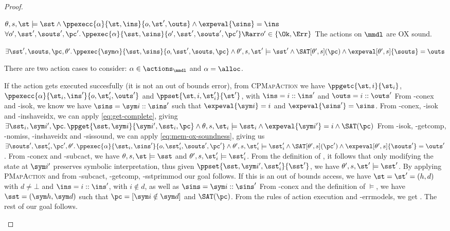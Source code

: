 \begin{proof}


\pfassume \begin{hypvlist}
 $\theta,s,\st\models\sst \land \ppexecc{\alpha}{\st,\ins}{o,\st',\outs} \land \expeval{\sins}=\ins$
 $\forall o', \sst', \souts', \pc'\ldotp \ppexec{\alpha}{\sst,\sins}{o',\sst',\souts',\pc'} \Rarr o' \in \{ \Ok, \Err \}$
 The actions on $\mmdl$ are OX sound.
\end{hypvlist}
\pfprove \begin{goalvlist}
 $\exists \sst',\souts,\pc,\theta'\ldotp \ppexec{\sym\alpha}{\sst,\sins}{o,\sst',\souts,\pc} \land \theta',s,\st'\models \sst' \land  \SAT[\theta',s](\pc) \land \expeval[\theta',s]{\souts}=\outs$
\end{goalvlist}

There are two action cases to consider: $\alpha\in\actions_\mmdl$ and $\alpha=\alloc$.

\pfcase{$\alpha\in\actions_\mmdl$}

\begin{hypvlist}
 If the action gets executed succesfully (it is not an out of bounds error), from \textsc{CPMapAction} we have $\ppgetc{\st,i}{\st_i}$,  $\ppexecc{\alpha}{\st_i,\ins'}{o,\st'_i,\outs'}$ and $\ppset{\st,i,\st'_i}{\st'}$, with $\ins=i::\ins'$ and $\outs=i::\outs'$
 From \hyp{conex} and \hyp{isok}, we know we have $\sins=\sym i::\sins'$ such that $\expeval{\sym i}=i$ and $\expeval{\sins'}=\sins$.%
 From \hyp{conex}, \hyp{isok} and \hyp{inshaveidx}, we can apply \ref{eq:get-complete}, giving $\exists \sst_i, \sym i', \pc \ldotp \ppget{\sst,\sym i}{\sym i', \sst_i, \pc} \land \theta,s,\st_i\models\sst_i \land \expeval{\sym i'}=i \land \SAT(\pc)$
 From \hyp{isok}, \hyp{getcomp}, \hyp{nomiss}, \hyp{inshaveidx} and \hyp{sissound}, we can apply \ref{eq:mem-ox-soundness}, giving us $\exists \souts',\sst'_i,\pc',\theta'\ldotp \ppexec{\alpha}{\sst_i,\sins'}{o,\sst'_i,\souts',\pc'}\land \theta',s,\st_i'\models\sst_i' \land \SAT[\theta',s](\pc') \land \expeval[\theta',s]{\souts'}=\outs'$.%
 From \hyp{conex} and \hyp{subcact}, we have $\theta,s,\st\models\sst$ and $\theta',s,\st_i'\models\sst_i'$. From the definition of , it follows that only modifying the state at $\sym i'$ preserves symbolic interpretation, thus given $\ppset{\sst,\sym i',\sst_i'}{\sst'}$, we have $\theta',s,\st'\models\sst'$.
 By applying \textsc{PMapAction} and from \hyp{subcact}, \hyp{getcomp}, \hyp{sstprimmod} our goal  follows.
 If this is an out of bounds access, we have $\st=\st'=(h,d)$ with $d\neq\bot$ and $\ins=i::\ins'$, with $i\notin d$, as well as $\sins=\sym i::\sins'$ 
 From \hyp{conex} and the definition of $\models$, we have $\sst=(\sym h, \sym d)$ such that $\pc=[\sym i\notin \sym d]$ and $\SAT(\pc)$. 
 From the rules of action execution and \hyp{errmodels}, we get \ppexec{\alpha}{\sst,\sins}{\Err,\sst,[],\pc}. The rest of our goal  follows.
\end{hypvlist}


\end{proof}
